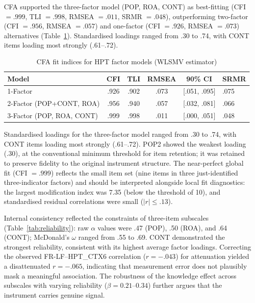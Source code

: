\documentclass[pdflatex,sn-apa]{sn-jnl}%
\begin{document}
CFA supported the three-factor model (POP, ROA, CONT) as best-fitting (CFI $= .999$, TLI $= .998$, RMSEA $= .011$, SRMR $= .048$), outperforming two-factor (CFI $= .956$, RMSEA $= .057$) and one-factor (CFI $= .926$, RMSEA $= .073$) alternatives (Table~\ref{tab:cfa}). Standardised loadings ranged from .30 to .74, with CONT items loading most strongly (.61--.72).

\begin{table}[ht]
\caption{CFA fit indices for HPT factor models (WLSMV estimator)}\label{tab:cfa}
\begin{tabular*}{\textwidth}{@{\extracolsep\fill}lccccl}
\toprule
Model & CFI & TLI & RMSEA & 90\% CI & SRMR \\
\midrule
1-Factor & .926 & .902 & .073 & {[}.051, .095{]} & .075 \\
2-Factor (POP+CONT, ROA) & .956 & .940 & .057 & {[}.032, .081{]} & .066 \\
3-Factor (POP, ROA, CONT) & .999 & .998 & .011 & {[}.000, .051{]} & .048 \\
\bottomrule
\end{tabular*}
\end{table}

Standardised loadings for the three-factor model ranged from .30 to .74, with CONT items loading most strongly (.61--.72). POP2 showed the weakest loading (.30), at the conventional minimum threshold for item retention; it was retained to preserve fidelity to the original instrument structure. The near-perfect global fit (CFI $= .999$) reflects the small item set (nine items in three just-identified three-indicator factors) and should be interpreted alongside local fit diagnostics: the largest modification index was 7.35 (below the threshold of 10), and standardised residual correlations were small ($|r| \leq .13$).

Internal consistency reflected the constraints of three-item subscales (Table~\ref{tab:reliability}): raw $\alpha$ values were .47 (POP), .50 (ROA), and .64 (CONT); McDonald's $\omega$ ranged from .55 to .69. CONT demonstrated the strongest reliability, consistent with its highest average factor loadings. Correcting the observed FR-LF--HPT\_CTX6 correlation ($r = -.043$) for attenuation yielded a disattenuated $r = -.065$, indicating that measurement error does not plausibly mask a meaningful association. The robustness of the knowledge effect across subscales with varying reliability ($\beta = 0.21$--$0.34$) further argues that the instrument carries genuine signal.
\end{document}

